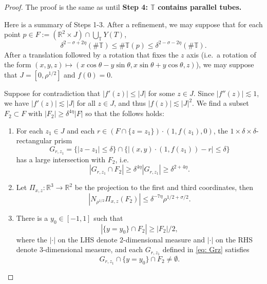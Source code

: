 \documentclass[letterpaper, reqno,11pt]{article}
\numberwithin{equation}{section}
\newcommand{\RR}{\mathbb{R}}
\newcommand{\TT}{\mathbb{T}}
\numberwithin{thm}{section}
\theoremstyle{remark}
\begin{document}
\begin{proof}
    The proof is the same as \cite[Lemma 6.3]{WZ} until {\bf Step 4: $\TT$ contains parallel tubes. }



Here is a summary of Steps 1-3. After a refinement, we may suppose that for each point $p\in F:= (\RR^2 \times J) \cap \bigcup_{\TT} Y(T)$, 
\begin{equation} \label{eq: Tp}
\delta^{2-\sigma+2\eta} (\#\TT)  \leq \#\TT(p) \leq \delta^{2-\sigma-2\eta} (\#\TT) . \end{equation}  
After a translation followed by a rotation that fixes the $z$ axis (i.e.~a rotation of the form $(x,y,z)\mapsto(x\cos\theta-y\sin\theta, x\sin\theta+y\cos\theta,z)$), we may suppose that $J=[0, \rho^{1/2}]$ and $f(0)=0$.  

Suppose for contradiction that $|f'(z)|\leq |J|$ for some $z\in J$. Since $|f''(z)|\lesssim 1$, we have $|f'(z)|\lesssim |J|$ for all $z\in J$, and thus $|f(z)|\lesssim |J|^2$.  We find a subset $F_2\subset F$ with $|F_2|\geq \delta^{4\eta}|F|$ so that the follows holds:
\begin{enumerate}

    \item For each $z_1\in J$ and each $r\in (F\cap \{z=z_1\})\cdot (1, f(z_1), 0)$, the $1\times \delta \times \delta$-rectangular prism 
    \begin{equation}\label{eq: Grz}
    G_{r, z_1} =\{ |z-z_1|\leq \delta\}\cap \{|(x,y)\cdot (1, f(z_1))-r|\leq \delta\}
    \end{equation}
    has a large intersection with $F_2$, i.e.
    \begin{equation}
        |G_{r, z_1}\cap F_2|\geq \delta^{4\eta}|G_{r,z_1}|\geq \delta^{2+4\eta}.
    \end{equation}

    \item Let $\Pi_{x,z}: \RR^3\rightarrow \RR^2$ be the projection to the first and third coordinates, then \[|N_{\rho^{1/2}}\Pi_{x,z}(F_2)|\leq \delta^{-7\eta} \rho^{1/2+\sigma/2}.\]
    
    \item 
    There is a $y_0\in [-1,1]$ such that 
    \[
    |\{y=y_0\}\cap F_2|\geq |F_2|/2,
    \]
    where the $|\cdot|$ on the LHS denote $2$-dimensional measure and $|\cdot|$ on the RHS denote $3$-dimensional measure, 
    and each $G_{r, z_1}$ defined in \eqref{eq: Grz} satisfies
    \[
    G_{r, z_1}\cap \{y=y_0\}\cap F_2\neq \emptyset.
    \]
\end{enumerate}


\end{proof}
\end{document}
